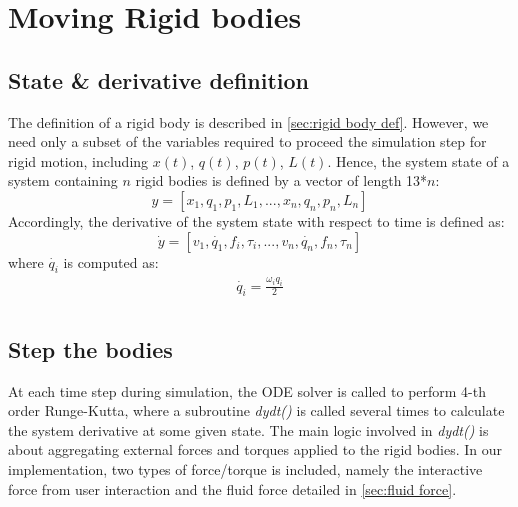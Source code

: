 \section{Moving Rigid bodies}
\subsection{State \& derivative definition}
The definition of a rigid body is described in \autoref{sec:rigid body def}. However, we need only a subset of the variables required to proceed the simulation step for rigid motion, including $x(t)$, $q(t)$, $p(t)$, $L(t)$. Hence, the system state of a system containing $n$ rigid bodies is defined by a vector of length 13*$n$:
\begin{equation*}
    y=[x_1,q_1,p_1,L_1, ..., x_n,q_n,p_n,L_n]
\end{equation*}
Accordingly, the derivative of the system state with respect to time is defined as:
\begin{equation*}
    \Dot{y}=[v_1,\Dot{q_1},f_i,\tau_i, ..., v_n,\Dot{q_n},f_n,\tau_n]
\end{equation*}
where $\Dot{q_i}$ is computed as:
\begin{gather*}
\Dot{q_i}=\frac{\omega_iq_i}{2}\\
\end{gather*}
\subsection{Step the bodies}
\label{sec:step bodies}
At each time step during simulation, the ODE solver is called to perform 4-th order Runge-Kutta, where a subroutine \emph{dydt()} is called several times to calculate the system derivative at some given state. The main logic involved in \emph{dydt()} is about aggregating external forces and torques applied to the rigid bodies. In our implementation, two types of force/torque is included, namely the interactive force from user interaction and the fluid force detailed in \autoref{sec:fluid force}.
